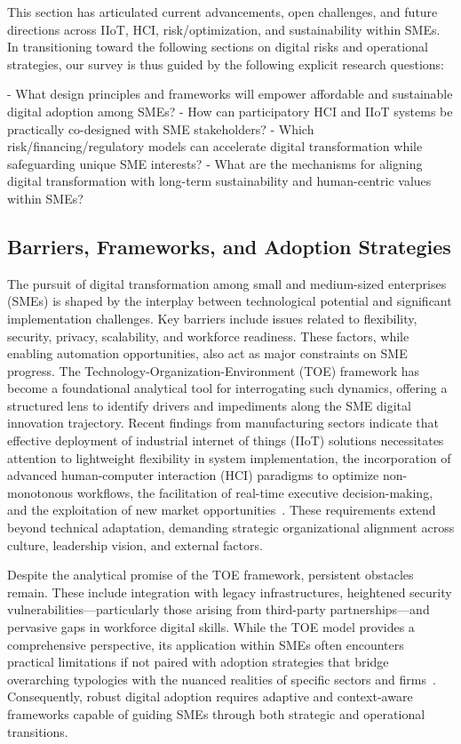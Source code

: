 \documentclass[sigconf]{acmart}
\begin{document}
This section has articulated current advancements, open challenges, and future directions across IIoT, HCI, risk/optimization, and sustainability within SMEs. In transitioning toward the following sections on digital risks and operational strategies, our survey is thus guided by the following explicit research questions:

- What design principles and frameworks will empower affordable and sustainable digital adoption among SMEs?
- How can participatory HCI and IIoT systems be practically co-designed with SME stakeholders?
- Which risk/financing/regulatory models can accelerate digital transformation while safeguarding unique SME interests?
- What are the mechanisms for aligning digital transformation with long-term sustainability and human-centric values within SMEs?

\subsection{Barriers, Frameworks, and Adoption Strategies}

The pursuit of digital transformation among small and medium-sized enterprises (SMEs) is shaped by the interplay between technological potential and significant implementation challenges. Key barriers include issues related to flexibility, security, privacy, scalability, and workforce readiness. These factors, while enabling automation opportunities, also act as major constraints on SME progress. The Technology-Organization-Environment (TOE) framework has become a foundational analytical tool for interrogating such dynamics, offering a structured lens to identify drivers and impediments along the SME digital innovation trajectory. Recent findings from manufacturing sectors indicate that effective deployment of industrial internet of things (IIoT) solutions necessitates attention to lightweight flexibility in system implementation, the incorporation of advanced human-computer interaction (HCI) paradigms to optimize non-monotonous workflows, the facilitation of real-time executive decision-making, and the exploitation of new market opportunities~\cite{ref89}. These requirements extend beyond technical adaptation, demanding strategic organizational alignment across culture, leadership vision, and external factors.

Despite the analytical promise of the TOE framework, persistent obstacles remain. These include integration with legacy infrastructures, heightened security vulnerabilities—particularly those arising from third-party partnerships—and pervasive gaps in workforce digital skills. While the TOE model provides a comprehensive perspective, its application within SMEs often encounters practical limitations if not paired with adoption strategies that bridge overarching typologies with the nuanced realities of specific sectors and firms~\cite{ref89}. Consequently, robust digital adoption requires adaptive and context-aware frameworks capable of guiding SMEs through both strategic and operational transitions.
\end{document}
